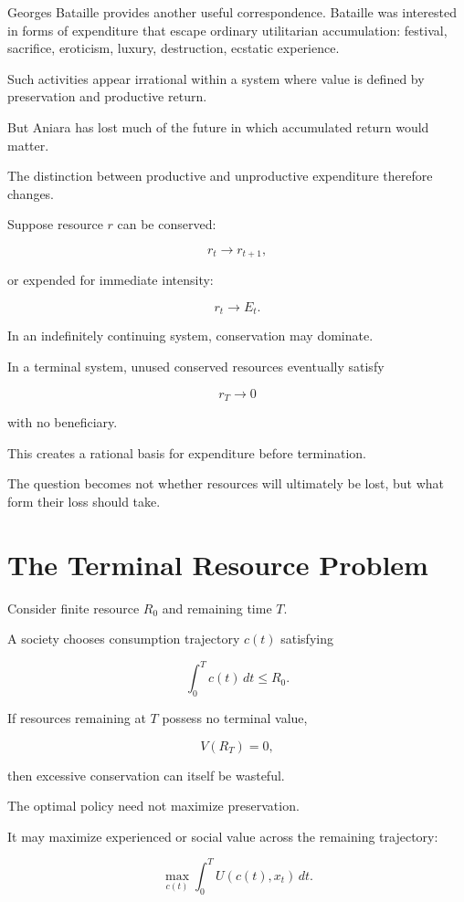 \documentclass[11pt,oneside]{book}
\theoremstyle{definition}
\theoremstyle{remark}
\begin{document}
Georges Bataille provides another useful correspondence. Bataille was interested in forms of expenditure that escape ordinary utilitarian accumulation: festival, sacrifice, eroticism, luxury, destruction, ecstatic experience.

Such activities appear irrational within a system where value is defined by preservation and productive return.

But Aniara has lost much of the future in which accumulated return would matter.

The distinction between productive and unproductive expenditure therefore changes.

Suppose resource \(r\) can be conserved:

\[
r_t\rightarrow r_{t+1},
\]

or expended for immediate intensity:

\[
r_t\rightarrow E_t.
\]

In an indefinitely continuing system, conservation may dominate.

In a terminal system, unused conserved resources eventually satisfy

\[
r_T\rightarrow0
\]

with no beneficiary.

This creates a rational basis for expenditure before termination.

The question becomes not whether resources will ultimately be lost, but what form their loss should take.

\section{The Terminal Resource Problem}

Consider finite resource \(R_0\) and remaining time \(T\).

A society chooses consumption trajectory \(c(t)\) satisfying

\[
\int_0^T c(t)\,dt
\leq
R_0.
\]

If resources remaining at \(T\) possess no terminal value,

\[
V(R_T)=0,
\]

then excessive conservation can itself be wasteful.

The optimal policy need not maximize preservation.

It may maximize experienced or social value across the remaining trajectory:

\[
\max_{c(t)}
\int_0^T
U(c(t),x_t)\,dt.
\]
\end{document}
